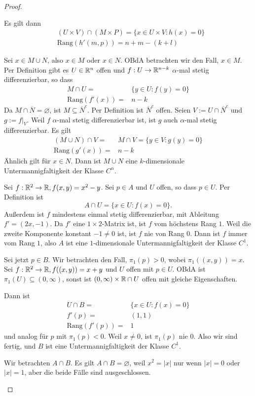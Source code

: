 \begin{proof}
\begin{parts}
Es gilt dann
\begin{align*}
	&(U\times V)\cap (M\times P)=\{x\in U\times V:h(x)=0\} \\
	&\text{Rang}(h'(m,p))=n+m-(k+l)
\end{align*}
\item Sei $x\in M\cup N$, also $x\in M$ oder $x\in N$. OBdA betrachten wir den Fall, $x\in M$. Per Definition gibt es $U\in \mathbb{R}^n$ offen und $f:U\to \mathbb{R}^{n-k}$ $\alpha$-mal stetig differenzierbar, so dass
	\begin{align*}
		M\cap U=&\{y\in U:f(y)=0\} \\
		\text{Rang}(f'(x))=&n-k
	\end{align*}
	Da $M\cap \overline{N}=\varnothing$, ist $M\subseteq \overline{N}^c$. Per Definition ist $\overline{N}^c$ offen. Seien $V:=U\cap \overline{N}^c$ und $g:=f|_V$. Weil $f$ $\alpha$-mal stetig differenzierbar ist, ist $g$ auch $\alpha$-mal stetig differenzierbar. Es gilt
	\begin{align*}
		(M\cup N)\cap V=&M\cap V=\{y\in V:g(y)=0\} \\
		\text{Rang}(g'(x))=&n-k
	\end{align*}
	Ähnlich gilt f\"{u}r $x\in N$. Dann ist $M\cup N$ eine $k$-dimensionale Untermannigfaltigkeit der Klasse $C^\alpha$.
\item Sei $f:\mathbb{R}^2\to \mathbb{R}, f(x,y)=x^2-y$. Sei $p\in A$ und $U$ offen, so dass $p\in U$. Per Definition ist
	\[
	A\cap U=\{x\in U: f(x)=0\} 
	.\] 
	Außerdem ist $f$ mindestens einmal stetig differenzierbar, mit Ableitung $f'=(2x,-1)$. Da $f'$ eine $1\times 2$-Matrix ist, ist $f$ vom höchstens Rang $1$. Weil die zweite Komponente konstant $-1\neq 0$ ist, ist $f$ nie von Rang $0$. Dann ist $f$ immer vom Rang $1$, also $A$ ist eine $1$-dimensionale Untermannigfaltigkeit der Klasse $C^1$.

	Sei jetzt $p\in B$. Wir betrachten den Fall, $\pi_1(p)>0$, wobei $\pi_1((x,y))=x$. Sei $f:\mathbb{R}^2\to \mathbb{R}, f((x,y))=x+y$ und $U$ offen mit $p\in U$. OBdA ist $\pi_1(U)\subseteq (0,\infty)$, sonst ist $(0,\infty)\times \mathbb{R} \cap U$ offen mit gleiche Eigenschaften.

	Dann ist
	\begin{align*}
		U\cap B=&\{x\in U:f(x)=0\} \\
		f'(p)=&(1,1)\\
		\text{Rang}(f'(p))=&1
	\end{align*}
	und analog f\"{u}r $p$ mit $\pi_1(p)<0$. Weil $x\neq 0$, ist $\pi_1(p)$ nie $0$. Also wir sind fertig, und $B$ ist eine Untermannigfaltigkeit der Klasse $C^1$.
\item Wir betrachten $A\cap B$. Es gilt $A\cap B=\varnothing$, weil $x^2=|x|$ nur wenn $|x|=0$ oder $|x|=1$, aber die beide Fälle sind ausgeschlossen.


\end{parts}
\end{proof}
